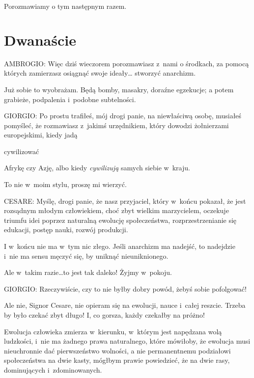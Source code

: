 \documentclass[oneside,polish,11pt,sfheadings]{mwbk}
\begin{document}
 
Porozmawiamy o tym następnym razem. 










\chapter*{Dwanaście}



 
\noindent AMBROGIO: Więc dziś wieczorem porozmawiasz z~nami o środkach, za pomocą których zamierzasz osiągnąć swoje ideały\ldots
stworzyć anarchizm. 

 
Już sobie to wyobrażam. Będą bomby, masakry, doraźne egzekucje; a potem grabieże, podpalenia i~podobne subtelności. 




 
\noindent GIORGIO: Po prostu trafiłeś, mój drogi panie, na niewłaściwą osobę, musiałeś pomyśleć, że rozmawiasz z~jakimś
urzędnikiem, który dowodzi żołnierzami europejskimi, kiedy jadą
\begin{itshape}cywilizować \end{itshape} Afrykę czy Azję, albo kiedy
\textit{cywilizują } samych siebie w~kraju. 

 
To nie w~moim stylu, proszę mi wierzyć. 




 
\noindent CESARE: Myślę, drogi panie, że nasz przyjaciel, który w~końcu pokazał, że jest rozsądnym młodym człowiekiem, choć zbyt
wielkim marzycielem, oczekuje triumfu idei poprzez naturalną ewolucję społeczeństwa, rozprzestrzenianie się edukacji,
postęp nauki, rozwój produkcji. 

 
I w~końcu nie ma w~tym nic złego. Jeśli anarchizm ma nadejść, to nadejdzie i~nie ma sensu męczyć się, by uniknąć
nieuniknionego. 

 
Ale w~takim razie\ldots to jest tak daleko! Żyjmy w~pokoju. 




 
\noindent GIORGIO: Rzeczywiście, czy to nie byłby dobry powód, żebyś sobie pofolgować! 

 
Ale nie, Signor Cesare, nie opieram się na ewolucji, nauce i~całej reszcie. Trzeba by było czekać zbyt długo! I, co
gorsza, każdy czekałby na próżno! 

 
Ewolucja człowieka zmierza w~kierunku, w~którym jest napędzana wolą ludzkości, i~nie ma żadnego prawa naturalnego, które
mówiłoby, że ewolucja musi nieuchronnie dać pierwszeństwo wolności, a nie permanentnemu podziałowi społeczeństwa na
dwie kasty, mógłbym prawie powiedzieć, że na dwie rasy, dominujących i~zdominowanych. 
\end{document}
